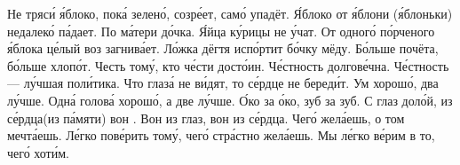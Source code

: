 \documentclass[a4paper]{article}
\begin{document}
         {Не тряси́ я́блоко, пока́ зелено́,
            созре́ет, само́ упадёт.}
         {Я́блоко от я́блони (я́блоньки)
             недалеко́ па́дает.
        \mitem По ма́тери до́чка.}
         {Я́йца ку́рицы не у́чат.}
         {От одного́ по́рченого я́блока це́лый
              воз загнива́ет.
        \mitem Ло́жка дёгтя испо́ртит бо́чку мёду.}
         {Бо́льше почёта, бо́льше хлопо́т.
        }
         {Честь тому́, кто че́сти досто́ин.}
         {Че́стность долгове́чна.
        \mitem Че́стность --- лу́чшая поли́тика.
        }
        {Что глаза́ не ви́дят, то се́рдце
             не береди́т.}
         {Ум хорошо́, два лу́чше.
         \mitem Одна́ голова́ хорошо́, а две лу́чше.
         }
         {О́ко за о́ко, зуб за зуб.}
         {С глаз доло́й, из се́рдца(из па́мяти) вон .
        \mitem Вон из глаз, вон из се́рдца.}
         {Чего́ жела́ешь, о том мечта́ешь.
         \mitem Ле́гко пове́рить тому́, чего́ стра́стно жела́ешь.
        \mitem Мы ле́гко ве́рим в то, чего́ хоти́м.
        }
\end{document}
